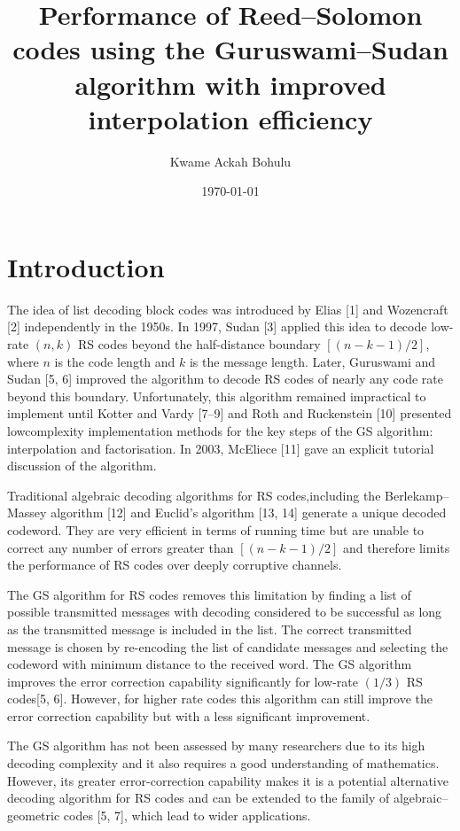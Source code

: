 \documentclass[fontsize=12pt]{article}
\title{Performance of Reed–Solomon codes using the
Guruswami–Sudan algorithm with improved
interpolation efficiency}
\author{Kwame Ackah Bohulu}
\date{\today}
\begin{document}
\maketitle

\newpage
\section{Introduction}
The idea of list decoding block codes was introduced by
Elias [1] and Wozencraft [2] independently in the 1950s.
In 1997, Sudan [3] applied this idea to decode low-rate
$(n, k)$ RS codes beyond the half-distance boundary
$[(n-k-1)/2]$, where $n$ is the code length and $k$ is the
message length. Later, Guruswami and Sudan [5, 6]
improved the algorithm to decode RS codes of nearly any
code rate beyond this boundary. 
Unfortunately, this algorithm remained 
impractical to implement until Kotter and Vardy
[7–9] and Roth and Ruckenstein [10] presented lowcomplexity
implementation methods for the key steps of
the GS algorithm: interpolation and factorisation. In 2003,
McEliece [11] gave an explicit tutorial discussion of the
algorithm.

Traditional algebraic decoding algorithms for RS codes,including the Berlekamp–Massey algorithm [12] and
Euclid’s algorithm [13, 14]
generate a unique decoded codeword. They are very efficient in terms
of running time but are unable to correct any
number of errors greater than $[(n-k-1)/2]$ and therefore limits the
performance of RS codes over deeply corruptive channels.

The GS algorithm for RS codes removes this limitation by
finding a list of possible transmitted messages with decoding
considered to be successful as long as the transmitted
message is included in the list. The correct transmitted
message is chosen by re-encoding the list of candidate
messages and selecting the codeword with minimum
distance to the received word. The GS algorithm improves the error
correction capability significantly for low-rate $(1/3)$ RS
codes[5, 6]. However, for higher rate codes this algorithm can
still improve the error correction capability but with a less
significant improvement.

The GS algorithm has not been assessed by many
researchers due to its high decoding complexity and it
also requires a good understanding of mathematics.
However, its greater error-correction capability makes it is
a potential alternative decoding algorithm for RS codes
and can be extended to the family of algebraic–geometric
codes [5, 7], which lead to wider applications. 
\end{document}
